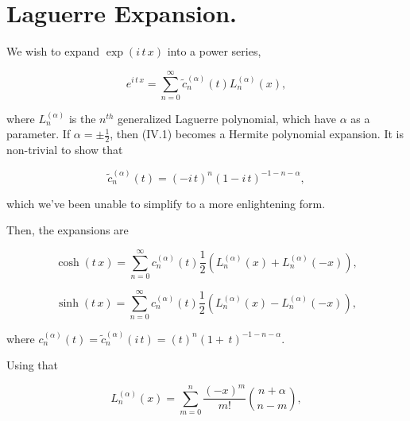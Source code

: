 \documentclass[amsmath,amssymb,floatfix]{revtex4}
\numberwithin{equation}{section}
\newcommand{\floor}[0]{ \textrm{fl} }
\begin{document}
\section{\label{sec:level3}Laguerre Expansion.\protect}

\noindent 
We wish to expand $\exp{(i \, t \, x)}$ into a power series,

\begin{equation}
e^{i \, t \, x} = \sum _{n=0}^\infty \tilde{c}_n^{(\alpha)}(t) L_n^{(\alpha)}(x),
\end{equation}

\noindent where $L_n^{(\alpha)}$ is the $n^{th}$ generalized Laguerre polynomial, which have $\alpha$ as a parameter. If $\alpha = \pm \frac{1}{2}$, then (IV.1) becomes a Hermite polynomial expansion. It is non-trivial to show that


\begin{equation}
\tilde{c}_n^{(\alpha)}(t) = (-i \, t)^n (1-i \, t)^{-1-n-\alpha},
\end{equation}

\noindent 
which we've been unable to simplify to a more enlightening form.



Then, the expansions are 

\begin{equation}
\cosh{(t \, x)} = \sum _{n=0}^\infty {c}_n^{(\alpha)}(t) \frac{1}{2} \left( L_n^{(\alpha)}(x) + L_n^{(\alpha)}(-x) \right),
\end{equation}

\begin{equation}
\sinh{(t \, x)} = \sum _{n=0}^\infty {c}_n^{(\alpha)}(t) \frac{1}{2} \left( L_n^{(\alpha)}(x) - L_n^{(\alpha)}(-x) \right),
\end{equation}


\noindent
where  ${c}_n^{(\alpha)}(t) =   \tilde{c}_n^{(\alpha)}(i \, t) =  (t)^n (1+ \, t)^{-1-n-\alpha}$.

	Using that

\begin{equation}
	L_n^{(\alpha)}(x)= \sum_{m=0}^n \frac{(-x)^m }{m!}  \binom {n+\alpha} {n-m},
\end{equation}


\end{document}
